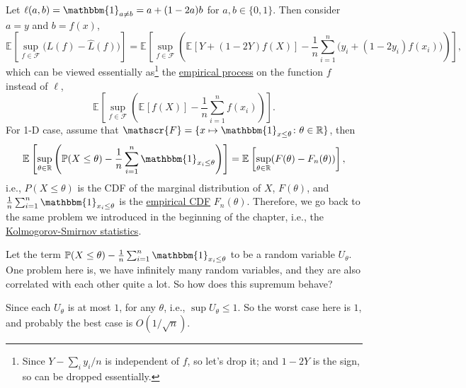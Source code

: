 \begin{eg}\label{eg:1D-classification-thresholds}
	Let \(\ell (a, b) = \mathbbm{1}_{a \neq b} = a + (1 - 2a)b\) for \(a, b\in \{ 0, 1 \} \). Then consider \(a = y\) and \(b = f(x)\),
	\[
		\mathbb{E}_{}\left[\sup _{f\in \mathscr{F} } \big( L(f) - \hat{L} (f) \big) \right]
		= \mathbb{E}_{}\left[\sup _{f\in \mathscr{F} } \left( \mathbb{E}_{}\left[Y + (1 - 2Y)f(X) \right] - \frac{1}{n} \sum_{i=1}^{n} \big( y_i + (1 - 2y_i)f(x_i) \big) \right)  \right],
	\]
	which can be viewed essentially as\footnote{Since \(Y - \sum_{i} y_i / n\) is independent of \(f\), so let's drop it; and \(1 - 2Y\) is the sign, so can be dropped essentially.} the \hyperref[def:EP]{empirical process} on the function \(f\) instead of \(\ell \),
	\[
		\mathbb{E}_{}\left[\sup _{f\in \mathscr{F} } \left( \mathbb{E}_{}\left[f(X) \right] - \frac{1}{n}\sum_{i=1}^{n} f(x_i) \right)  \right].
	\]
	For 1-D case, assume that \(\mathscr{F} = \{ x \mapsto \mathbbm{1}_{x \leq \theta } \colon \theta \in \mathbb{R}  \}\), then
	\[
		\mathbb{E}_{}\left[\sup _{\theta \in \mathbb{R} } \left( \mathbb{P} (X \leq \theta ) - \frac{1}{n} \sum_{i=1}^{n} \mathbbm{1}_{x_i \leq \theta } \right) \right]
		= \mathbb{E}_{}\left[\sup _{\theta \in \mathbb{R} } (F(\theta ) - F_n(\theta )) \right] ,
	\]
	i.e., \(P(X \leq \theta )\) is the CDF of the marginal distribution of \(X\), \(F(\theta )\), and \(\frac{1}{n}\sum_{i=1}^{n} \mathbbm{1}_{x_i \leq \theta } \) is the \hyperref[def:empirical-CDF]{empirical CDF} \(F_n(\theta )\). Therefore, we go back to the same problem we introduced in the beginning of the chapter, i.e., the \hyperref[def:Kolmogorov-Smirnov-statistics]{Kolmogorov-Smirnov statistics}.

	Let the term \(\mathbb{P} (X \leq \theta ) - \frac{1}{n}\sum_{i=1}^{n} \mathbbm{1}_{x_i \leq \theta } \) to be a random variable \(U_\theta \). One problem here is, we have infinitely many random variables, and they are also correlated with each other quite a lot. So how does this supremum behave?

	Since each \(U_\theta \) is at most \(1\), for any \(\theta \), i.e., \(\sup U_\theta \leq 1\). So the worst case here is \(1\), and probably the best case is \(O(1 / \sqrt{n} )\).
\end{eg}